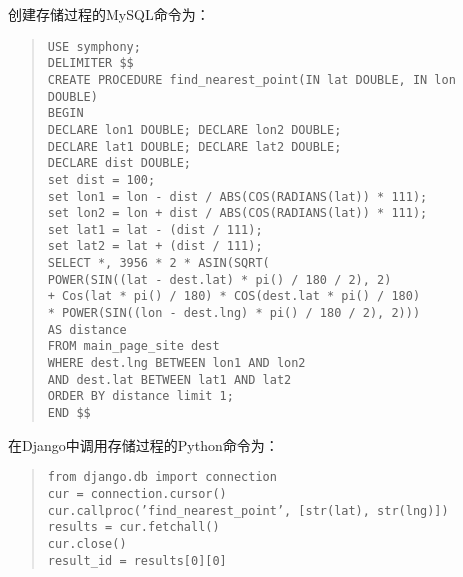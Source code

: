 创建存储过程的MySQL命令为：
\begin{quote}
  \texttt{USE symphony;\\
    DELIMITER \$\$\\
    CREATE PROCEDURE find\_nearest\_point(IN lat DOUBLE, IN lon DOUBLE)\\
    BEGIN\\
    DECLARE lon1 DOUBLE; DECLARE lon2 DOUBLE;\\
    DECLARE lat1 DOUBLE; DECLARE lat2 DOUBLE;\\
    DECLARE dist DOUBLE;\\
    set dist = 100;\\
    set lon1 = lon - dist / ABS(COS(RADIANS(lat)) * 111);\\
    set lon2 = lon + dist / ABS(COS(RADIANS(lat)) * 111);\\
    set lat1 = lat - (dist / 111);\\
    set lat2 = lat + (dist / 111);\\
    SELECT *, 3956 * 2 * ASIN(SQRT(\\
    POWER(SIN((lat - dest.lat) * pi() / 180 / 2), 2)\\
    + Cos(lat * pi() / 180) * COS(dest.lat * pi() / 180)\\
    * POWER(SIN((lon - dest.lng) * pi() / 180 / 2), 2)))\\
    AS distance\\
    FROM main\_page\_site dest\\
    WHERE dest.lng BETWEEN lon1 AND lon2\\
    AND dest.lat BETWEEN lat1 AND lat2\\
    ORDER BY distance limit 1;\\
    END \$\$} 
\end{quote}

在Django中调用存储过程的Python命令为：
\begin{quote}
  \texttt{from django.db import connection\\
    cur = connection.cursor()\\
    cur.callproc('find\_nearest\_point', [str(lat), str(lng)])\\
    results = cur.fetchall()\\
    cur.close()\\
    result\_id = results[0][0]}
\end{quote}


